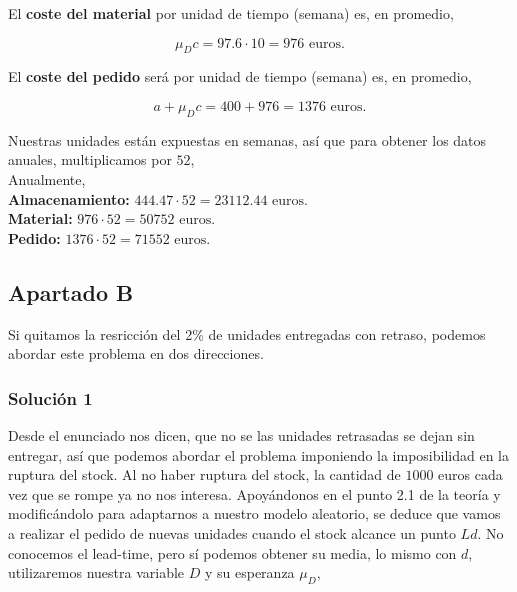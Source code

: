 \documentclass[a4paper,12pt]{article}
\begin{document}
El \textbf{coste del material} por unidad de tiempo (semana) es, en promedio,

$$ \mu_D c = 97.6\cdot 10 = 976 \text{ euros.}$$

El \textbf{coste del pedido} ser\'a por unidad de tiempo (semana) es, en promedio,

$$ a + \mu_D c = 400 + 976 = 1376 \text{ euros.}$$

Nuestras unidades est\'an expuestas en semanas, as\'i que para obtener los datos anuales, multiplicamos por $52$,\\

Anualmente,\\


\textbf{Almacenamiento:} $444.47\cdot 52 =  23112.44 \text{ euros.}$\\
\textbf{Material:} $976\cdot 52 = 50752\text{ euros.}$\\
\textbf{Pedido:} $1376\cdot 52 = 71552\text{ euros.}$\\



\pagebreak

\subsection{Apartado B}

Si quitamos la resricci\'on del 2\% de unidades entregadas con retraso, podemos abordar este problema en dos direcciones.


\subsubsection{Soluci\'on 1}
Desde el enunciado nos dicen, que no se las unidades retrasadas se dejan sin entregar, as\'i que podemos abordar el problema imponiendo la imposibilidad en la ruptura del stock. Al no haber ruptura del stock, la cantidad de $1000$ euros cada vez que se rompe ya no nos interesa. Apoy\'andonos en el punto 2.1 de la teor\'ia y modific\'andolo para adaptarnos a nuestro modelo aleatorio, se deduce que vamos a realizar el pedido de nuevas unidades cuando el stock alcance un punto $Ld$. No conocemos el lead-time, pero s\'i podemos obtener su media, lo mismo con $d$, utilizaremos nuestra variable $D$ y su esperanza $\mu_D$,
\end{document}
